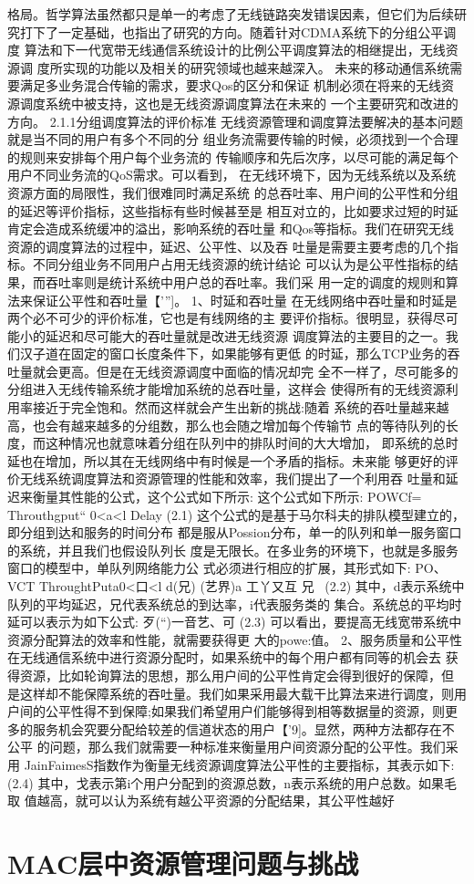 格局。哲学算法虽然都只是单一的考虑了无线链路突发错误因素，但它们为后续研
究打下了一定基础，也指出了研究的方向。随着针对CDMA系统下的分组公平调度
算法和下一代宽带无线通信系统设计的比例公平调度算法的相继提出，无线资源调
度所实现的功能以及相关的研究领域也越来越深入。
未来的移动通信系统需要满足多业务混合传输的需求，要求Qos的区分和保证
机制必须在将来的无线资源调度系统中被支持，这也是无线资源调度算法在未来的
一个主要研究和改进的方向。
2.1.1分组调度算法的评价标准
无线资源管理和调度算法要解决的基本问题就是当不同的用户有多个不同的分
组业务流需要传输的时候，必须找到一个合理的规则来安排每个用户每个业务流的
传输顺序和先后次序，以尽可能的满足每个用户不同业务流的QoS需求。可以看到，
在无线环境下，因为无线系统以及系统资源方面的局限性，我们很难同时满足系统
的总吞吐率、用户间的公平性和分组的延迟等评价指标，这些指标有些时候甚至是
相互对立的，比如要求过短的时延肯定会造成系统缓冲的溢出，影响系统的吞吐量
和Qos等指标。我们在研究无线资源的调度算法的过程中，延迟、公平性、以及吞
吐量是需要主要考虑的几个指标。不同分组业务不同用户占用无线资源的统计结论
可以认为是公平性指标的结果，而吞吐率则是统计系统中用户总的吞吐率。我们采
用一定的调度的规则和算法来保证公平性和吞吐量【’”]。
1、时延和吞吐量
在无线网络中吞吐量和时延是两个必不可少的评价标准，它也是有线网络的主
要评价指标。很明显，获得尽可能小的延迟和尽可能大的吞吐量就是改进无线资源
调度算法的主要目的之一。我们汉子道在固定的窗口长度条件下，如果能够有更低
的时延，那么TCP业务的吞吐量就会更高。但是在无线资源调度中面临的情况却完
全不一样了，尽可能多的分组进入无线传输系统才能增加系统的总吞吐量，这样会
使得所有的无线资源利用率接近于完全饱和。然而这样就会产生出新的挑战:随着
系统的吞吐量越来越高，也会有越来越多的分组数，那么也会随之增加每个传输节
点的等待队列的长度，而这种情况也就意味着分组在队列中的排队时间的大大增加，
即系统的总时延也在增加，所以其在无线网络中有时候是一个矛盾的指标。未来能
够更好的评价无线系统调度算法和资源管理的性能和效率，我们提出了一个利用吞
吐量和延迟来衡量其性能的公式，这个公式如下所示:
这个公式如下所示:
POWCf=
Throuthgput“
0<a<l
Delay (2.1)
这个公式的是基于马尔科夫的排队模型建立的，即分组到达和服务的时间分布
都是服从Possion分布，单一的队列和单一服务窗口的系统，并且我们也假设队列长
度是无限长。在多业务的环境下，也就是多服务窗口的模型中，单队列网络能力公
式必须进行相应的扩展，其形式如下:
PO、VCT
ThroughtPuta0<口<l
d(兄)
(艺界)a
工丫又互
兄~
 (2.2)
其中，d表示系统中队列的平均延迟，兄代表系统总的到达率，i代表服务类的
集合。系统总的平均时延可以表示为如下公式:
歹(“)一音艺、可 (2.3)
可以看出，要提高无线宽带系统中资源分配算法的效率和性能，就需要获得更
大的powe:值。
2、服务质量和公平性
在无线通信系统中进行资源分配时，如果系统中的每个用户都有同等的机会去
获得资源，比如轮询算法的思想，那么用户间的公平性肯定会得到很好的保障，但
是这样却不能保障系统的吞吐量。我们如果采用最大载干比算法来进行调度，则用
户间的公平性得不到保障;如果我们希望用户们能够得到相等数据量的资源，则更
多的服务机会究要分配给较差的信道状态的用户【’9]。显然，两种方法都存在不公平
的问题，那么我们就需要一种标准来衡量用户间资源分配的公平性。我们采用
JainFaimesS指数作为衡量无线资源调度算法公平性的主要指标，其表示如下:
 (2.4)
其中，戈表示第i个用户分配到的资源总数，n表示系统的用户总数。如果毛取
值越高，就可以认为系统有越公平资源的分配结果，其公平性越好

\section{MAC层中资源管理问题与挑战}

